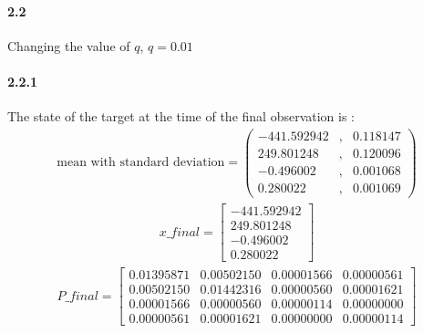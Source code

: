 \documentclass[a4paper]{article}
\begin{document}
\paragraph{2.2 } Changing the value of $q$, $q=0.01$ \\

\paragraph{2.2.1 } The state of the target at the time of the final observation is : \\
\begin{align*}
\text{mean with standard deviation} = 
	\left(\begin{matrix}
   -441.592942 & , &      0.118147 \\
    249.801248 & , &      0.120096 \\
     -0.496002 & , &      0.001068 \\
      0.280022 & , &      0.001069
	\end{matrix}\right)
\end{align*}
\begin{align*}
x\_final = \begin{bmatrix}
   -441.592942 \\
    249.801248 \\
     -0.496002 \\
      0.280022 
	\end{bmatrix}
\end{align*}
\begin{align*}
P\_final = \begin{bmatrix}
    0.01395871  &   0.00502150  &   0.00001566  &   0.00000561 \\
    0.00502150  &   0.01442316  &   0.00000560  &   0.00001621 \\
    0.00001566  &   0.00000560  &   0.00000114  &   0.00000000 \\
    0.00000561  &   0.00001621  &   0.00000000  &   0.00000114 
	\end{bmatrix}
\end{align*} \\
\end{document}
